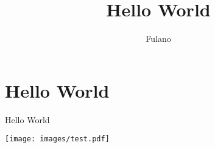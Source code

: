 \documentclass[A4paper, 12pt]{article}
\title{Hello World}
\author{Fulano}
\begin{document}
\nocite{*}
\tableofcontents
\maketitle

\cite{asyatoms}

\section{Hello World} %
\label{sec:hello_world}







Hello World


\texttt{[image: images/test.pdf]}

{}

\end{document}

